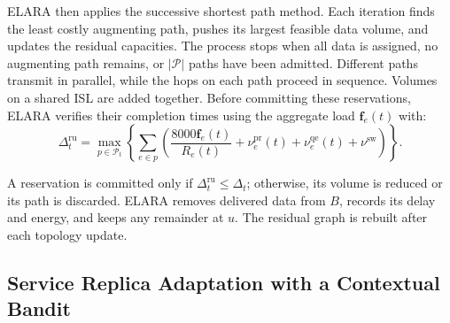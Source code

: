 \documentclass[10pt, conference, letterpaper]{IEEEtran}
\begin{document}

ELARA then applies the successive shortest path method. Each iteration finds the least costly augmenting path, pushes its largest feasible data volume, and updates the residual capacities. The process stops when all data is assigned, no augmenting path remains, or $|\mathcal P|$ paths have been admitted. 
Different paths transmit in parallel, while the hops on each path proceed in sequence. Volumes on a shared ISL are added together.
Before committing these reservations, ELARA verifies their completion times using the aggregate load $\mathbf{f}_e(t)$ with:
\begin{equation}
\Delta_t^{\text{ru}}=\max_{p\in\mathcal P_t}
\left\{\sum_{e\in p}\left(
\frac{8000\mathbf{f}_e(t)}{R_e(t)}+\nu_e^{\text{pr}}(t)
+\nu_e^{\text{qe}}(t)+\nu^{\text{sw}}
\right)\right\}.
\label{eq:new_phase_duration}
\end{equation}

A reservation is committed only if $\Delta_t^{\text{ru}}\leq\Delta_t$; otherwise, its volume is reduced or its path is discarded. ELARA removes delivered data from $B$, records its delay and energy, and keeps any remainder at $u$. The residual graph is rebuilt after each topology update. 


\subsection{Service Replica Adaptation with a Contextual Bandit}
\end{document}
